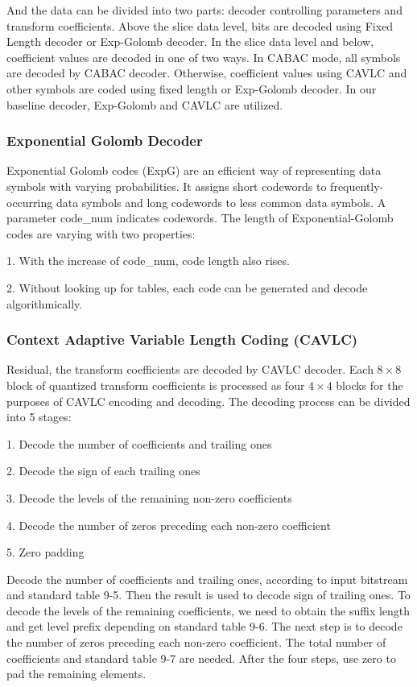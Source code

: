\documentclass[../main.tex]{subfiles}
\begin{document}
And the data can be divided into two parts: decoder controlling parameters and transform coefficients. Above the slice data level, bits are decoded using Fixed Length decoder or Exp-Golomb decoder. In the slice data level and below, coefficient values are decoded in one of two ways. In CABAC mode, all symbols are decoded by CABAC decoder. Otherwise, coefficient values using CAVLC and other symbols are coded using fixed length or Exp-Golomb decoder. In our baseline decoder, Exp-Golomb and CAVLC are utilized.

\subsubsection{ Exponential Golomb Decoder }

Exponential Golomb codes (ExpG) are an efficient way of representing data symbols with varying probabilities. It assigns short codewords to frequently-occurring data symbols and long codewords to less common data symbols. A parameter code\_num indicates codewords. The length of Exponential-Golomb codes are varying with two properties:

1. With the increase of code\_num, code length also rises.

2. Without looking up for tables, each code can be generated and decode algorithmically. 


\subsubsection{ Context Adaptive Variable Length Coding (CAVLC) }
Residual, the transform coefficients are decoded by CAVLC decoder. Each $8 \times 8$ block of quantized transform coefficients is processed as four $4 \times 4$ blocks for the purposes of CAVLC encoding and decoding. The decoding process can be divided into 5 stages:

    1. Decode the number of coefficients and trailing ones
    
    2. Decode the sign of each trailing ones
    
    3. Decode the levels of the remaining non-zero coefficients
    
    4. Decode the number of zeros preceding each non-zero coefficient
    
    5. Zero padding 

Decode the number of coefficients and trailing ones, according to input bitstream and standard table 9-5. Then the result is used to decode sign of trailing ones. To decode the levels of the remaining coefficients, we need to obtain the suffix length and get level prefix depending on standard table 9-6. The next step is to decode the number of zeros preceding each non-zero coefficient. The total number of coefficients and standard table 9-7 are needed. After the four steps, use zero to pad the remaining elements.
\end{document}
